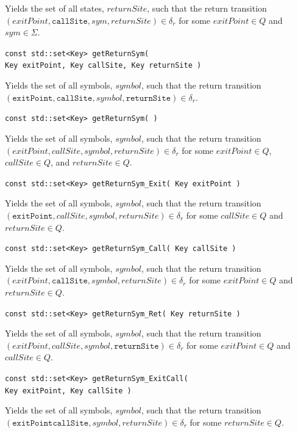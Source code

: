\documentclass{llncs}
\begin{document}
\begin{description}
    Yields the set of all states, $returnSite$, such that the return transition $(exitPoint,\texttt{callSite},sym,returnSite) \in \delta_r$ for some $exitPoint \in Q$ and $sym \in \Sigma$.

  \item\texttt{const std::set<Key> getReturnSym( \\ \hspace*{3.25cm}Key exitPoint, Key callSite, Key returnSite )}

    Yields the set of all symbols, $symbol$, such that the return transition $(\texttt{exitPoint},\texttt{callSite},symbol,\texttt{returnSite}) \in \delta_r$.

  \item\texttt{const std::set<Key> getReturnSym( )}

    Yields the set of all symbols, $symbol$, such that the return transition $(exitPoint,callSite,symbol,returnSite) \in \delta_r$ for some $exitPoint \in Q$, $callSite \in Q$, and $returnSite \in Q$.

  \item\texttt{const std::set<Key> getReturnSym\_Exit( Key exitPoint )}

    Yields the set of all symbols, $symbol$, such that the return transition $(\texttt{exitPoint},callSite,symbol,returnSite) \in \delta_r$ for some $callSite \in Q$ and $returnSite \in Q$.

  \item\texttt{const std::set<Key> getReturnSym\_Call( Key callSite )}

    Yields the set of all symbols, $symbol$, such that the return transition $(exitPoint,\texttt{callSite},symbol,returnSite) \in \delta_r$ for some $exitPoint \in Q$ and $returnSite \in Q$.

  \item\texttt{const std::set<Key> getReturnSym\_Ret( Key returnSite )}

    Yields the set of all symbols, $symbol$, such that the return transition $(exitPoint,callSite,symbol,\texttt{returnSite}) \in \delta_r$ for some $exitPoint \in Q$ and $callSite \in Q$.

  \item\texttt{const std::set<Key> getReturnSym\_ExitCall( \\ \hspace*{3.25cm} Key exitPoint, Key callSite )}

    Yields the set of all symbols, $symbol$, such that the return transition $(\texttt{exitPoint}\texttt{callSite},symbol,returnSite) \in \delta_r$ for some $returnSite \in Q$.


\end{description}
\end{document}
